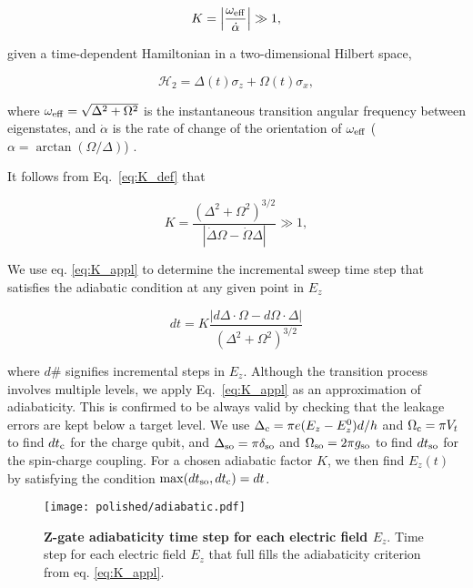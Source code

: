\begin{equation} \label{eq:K_def}
K=\left|\frac{\omega_{\rm eff}}{\dot{\alpha}}\right|\gg1,
\end{equation}

given a time-dependent Hamiltonian in a two-dimensional Hilbert space, 

 \begin{equation}
\mathcal{H}_2=\Delta(t)\sigma_z+\Omega(t)\sigma_x,
\end{equation}

where $\omega_{\rm eff}=\sqrt{\Delta^2+\Omega^2}$ is the instantaneous transition angular frequency between eigenstates, and $\dot{\alpha}$ is the rate of change of the orientation of $\omega_{\rm eff}$ ($\alpha=\arctan{(\Omega/\Delta)}$) \cite{Garwood2001}. 

It follows from Eq.~\ref{eq:K_def} that

\begin{equation} \label{eq:K_appl}
K=\frac{\left(\Delta^2+\Omega^2\right)^{3/2}}{|\dot{\Delta}\Omega-\dot{\Omega}\Delta|}\gg1,
\end{equation}

We use eq. \eqref{eq:K_appl} to determine the incremental sweep time step that satisfies the adiabatic condition at any given point in $E_z$

\begin{equation} \label{eq:dtK}
dt=K\frac{|d\Delta\cdot\Omega-d\Omega\cdot\Delta|}{\left(\Delta^2+\Omega^2\right)^{3/2}}
\end{equation}

where $d\#$ signifies incremental steps in $E_z$.
Although the transition process involves multiple levels, we apply Eq.~\ref{eq:K_appl} as an approximation of adiabaticity. This is confirmed to be always valid by checking that the leakage errors are kept below a target level.
We use $\Delta_{\rm c}=\pi e(E_z - E_z^0)d/h$ and $\Omega_{\rm c}=\pi V_t$ to find $dt_{\rm c}$ for the charge qubit, and $\Delta_{\rm so}=\pi\delta_{\rm so}$ and $\Omega_{\rm so}=2\pi g_{\rm so}$ to find $dt_{\rm so}$ for the spin-charge coupling.
 For a chosen adiabatic factor $K$, we then find $E_z(t)$ by satisfying the condition $\max(dt_{\rm so},dt_{\rm c})=dt$. 

\begin{figure}[h]
	\centering
	\texttt{[image: polished/adiabatic.pdf]}
	\caption[Z-gate adiabaticity time step for each electric field $E_z$]{\textbf{Z-gate adiabaticity time step for each electric field $E_z$}. Time step for each electric field $E_z$ that full fills the adiabaticity criterion from eq. \eqref{eq:K_appl}.}
		\label{fig:adiabatic_dt}
\end{figure}

